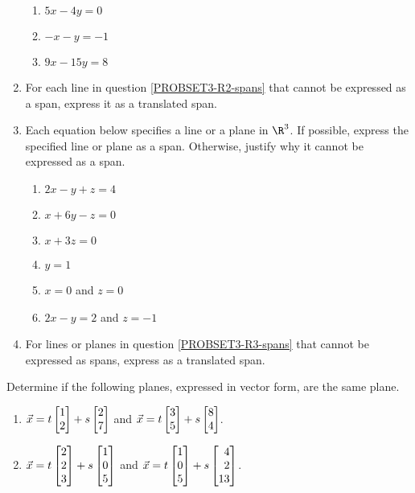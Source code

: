 \begin{exercises}
\begin{problist}
\begin{enumerate}
\begin{enumerate}
					\item $5x-4y=0$

					\item $-x-y=-1$

					\item $9x-15y=8$
				\end{enumerate}

			\item For each line in question \ref{PROBSET3-R2-spans} that cannot
				be expressed as a span, express it as a translated
				span.

			\item Each equation below specifies a line or a plane in $\R^3$. If possible,
				express the specified line or plane as a span. Otherwise,
				 justify
				why it cannot be expressed as a span. \label{PROBSET3-R3-spans}
				\begin{enumerate}
					\item $2x-y+z=4$

					\item $x+6y-z=0$

					\item $x+3z=0$

					\item $y=1$

					\item $x=0$ and $z=0$

					\item $2x-y=2$ and $z=-1$
				\end{enumerate}

			\item For lines or planes in question \ref{PROBSET3-R3-spans} that cannot
				be expressed as spans, express as a translated
				span.
		\end{enumerate}

		\prob Determine if the following planes, expressed in vector form, are the same plane.
		\begin{enumerate}
			\item $\vec x = t\mat{1\\2}+ s\mat{2\\7}$ and $\vec x =
				t\mat{3\\5}+ s\mat{8\\4}$.

			\item $\vec x = t\mat{2\\2\\3}+ s\mat{1\\0\\5}$ and $\vec
				x = t\mat{1\\0\\5}+ s\mat{4\\2\\13}$.


\end{enumerate}
\end{problist}
\end{exercises}
